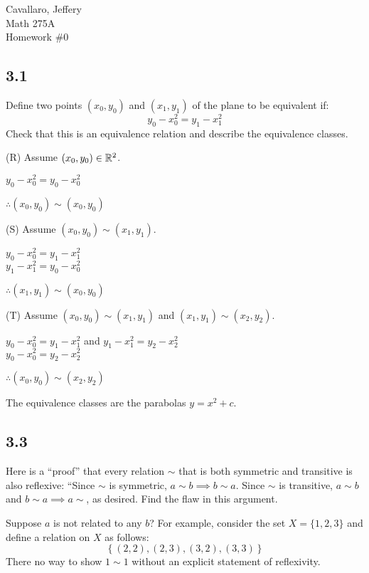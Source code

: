 \documentclass[letterpaper,12pt,fleqn]{article}
\begin{document}
Cavallaro, Jeffery \\
Math 275A \\
Homework \#0

\subsection*{3.1}

Define two points $(x_0,y_0)$ and $(x_1,y_1)$ of the plane to be equivalent if:
\[y_0-x_0^2=y_1-x_1^2\]
Check that this is an equivalence relation and describe the equivalence
classes.

\bigskip

\begin{description}
\item (R) Assume $(x_0,y_0)\in\mathbb{R}^2$.

  $y_0-x_0^2=y_0-x_0^2$

  $\therefore(x_0,y_0)\sim(x_0,y_0)$

\item (S) Assume $(x_0,y_0)\sim(x_1,y_1)$.

  $y_0-x_0^2=y_1-x_1^2$ \\
  $y_1-x_1^2=y_0-x_0^2$

  $\therefore(x_1,y_1)\sim(x_0,y_0)$

\item (T) Assume $(x_0,y_0)\sim(x_1,y_1)$ and $(x_1,y_1)\sim(x_2,y_2)$.
  
  $y_0-x_0^2=y_1-x_1^2$ and $y_1-x_1^2=y_2-x_2^2$ \\
  $y_0-x_0^2=y_2-x_2^2$

  $\therefore(x_0,y_0)\sim(x_2,y_2)$
\end{description}

The equivalence classes are the parabolas $y=x^2+c$.

\subsection*{3.3}

Here is a ``proof'' that every relation $\sim$ that is both symmetric and
transitive is also reflexive: ``Since $\sim$ is symmetric,
$a\sim b\implies b\sim a$. Since $\sim$ is transitive,
$a\sim b$ and $b\sim a\implies a\sim $, as desired. Find the flaw in this
argument.

\bigskip

Suppose $a$ is not related to any $b$? For example, consider the set
$X=\{1,2,3\}$ and define a relation on $X$ as follows:
\[\left\{(2,2),(2,3),(3,2),(3,3)\right\}\]
There no way to show $1\sim1$ without an explicit statement of reflexivity.
\end{document}
